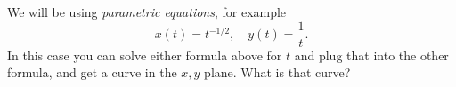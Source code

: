 We will be using \emph{parametric equations}, for example
    $$x(t) = t^{-1/2}, \quad y(t) = \frac{1}{t}.$$
In this case you can solve either formula above for $t$ and plug that into the other formula, and get a curve in the $x,y$ plane.  What is that curve?